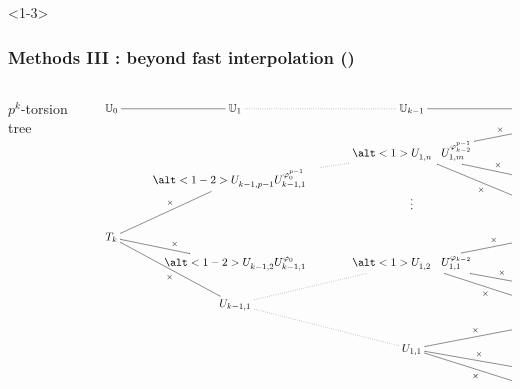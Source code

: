 \documentclass[10pt]{beamer}
\newcommand{\U}{\mathbb{U}}  %
\newcommand{\frob}{\varphi}  %
\newcommand{\0}{\mathcal{O}}  %
\begin{document}

\begin{frame}<1-3>
  \frametitle{Methods III : beyond fast interpolation (\cite{DF07})}
  
  \footnotesize

  \begin{columns}
    \begin{column}{0.3\textwidth}
      \normalsize
      $p^k$-torsion tree
    \end{column}
    \begin{column}{0.7\textwidth}
      \tiny

      \[\xymatrix@R=0pt@C=25pt{
	{\U_0 \ar@{-}[r]} & {\U_1 \ar@{.}[r]} &
	{\U_{k-1} \ar@{-}[r]} & {\U_k}
	\\
	& & & **[r](X - P_n)^{\frob^{p-1}_{k-1}}\ar@{-}"3,3"_-{\times} \\
	& & \alt<1>{U_{1,n}^{\phantom{\frob_{k-2}^{p-1}}}}{U_{1,m}^{\frob_{k-2}^{p-1}}}\ar@{.}"4,2" & {\vdots} \\
	& \alt<1-2>{U_{k-1,p-1}^{\phantom{\frob_0^{p-1}}}}{U_{k-1,1\phantom{-p}}^{\frob_0^{p-1}}}\ar@{-}"7,1"_{\times} & & **[r](X-P_n)^{\frob_{k-1}}\ar@{-}"3,3"_-{\times} \\
	& & {\vdots} & **[r](X - P_n)\ar@{-}"3,3"^-{\times} \\
	& & & \\
    T_k & & & **[r](X - P_2)^{\frob^{p-1}_{k-1}}\ar@{-}"8,3"_-{\times} \\
	& \alt<1-2>{U_{k-1,2}^{\phantom{\frob_0}}}{U_{k-1,1}^{\frob_0}}\ar@{-}"7,1"_{\times} & \alt<1>{U_{1,2}^{\phantom{\frob_{k-2}}}}{U_{1,1}^{\frob_{k-2}}}\ar@{.}"10,2" & {\vdots} \\
	& & & **[r](X-P_2)^{\frob_{k-1}}\ar@{-}"8,3"_-{\times}  \\
	& U_{k-1,1}\ar@{-}"7,1"^{\times} & & **[r](X - P_2)\ar@{-}"8,3"^-{\times} \\
	& & & **[r](X - P_1)^{\frob^{p-1}_{k-1}}\ar@{-}"12,3"_-{\times}  \\
	& & U_{1,1}\ar@{.}"10,2" & {\vdots} \\
	& & & **[r](X - P_1)^{\frob_{k-1}}\ar@{-}"12,3"_-{\times} \\
	& & & **[r](X - P_1)\ar@{-}"12,3"^-{\times}
      }\]
    \end{column}
  \end{columns}
\end{frame}

\end{document}

